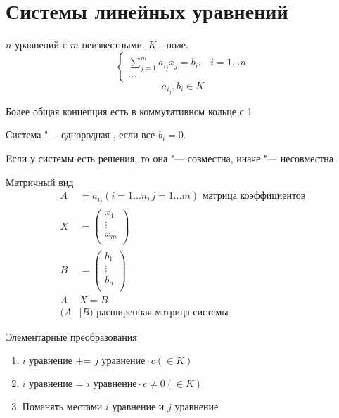 \section{Системы линейных уравнений}
\begin{Def}
$n$ уравнений с $m$ неизвестными. $K$ - поле.
\[ \left\{\begin{array}{ll}
\sum_{j=1}^{m}a_{i_j}x_j=b_i, &    i = 1 \dots n \\
\dots
\end{array} \right. \]
$$a_{i_j}, b_i \in K$$
\end{Def}
\begin{Def}
Более общая концепция есть в коммутативном кольце с 1
\end{Def}
\begin{Def}
Система "--- однородная , если все $b_i=0$.
\end{Def}
\begin{Def}
Eсли у системы есть решения, то она "--- совместна, иначе "--- несовместна
\end{Def}
\begin{Def}
Матричный вид
\[\begin{aligned}
A&=a_{i_j} (i=1 \dots n, j=1 \dots m) \text{  матрица коэффициентов}\\
X&= \begin{pmatrix}
				x_1\\
				\vdots\\
				x_m\\
			\end{pmatrix} \\
B&= \begin{pmatrix}
				b_1\\
				\vdots\\
				b_n\\
			\end{pmatrix} \\
A&X=B\\
(A&|B) \text{ расширенная матрица системы}
\end{aligned}\]
\end{Def}
\begin{Def}
Элементарные преобразования

\begin{enumerate}
	\item $i \text{ уравнение += }  j \text{ уравнение} \cdot c (\in K)$
	\item $i \text{ уравнение = }  i \text{ уравнение} \cdot c \neq 0(\in K)$
	\item Поменять местами $i$ уравнение и $j$ уравнение
\end{enumerate}
\end{Def}
